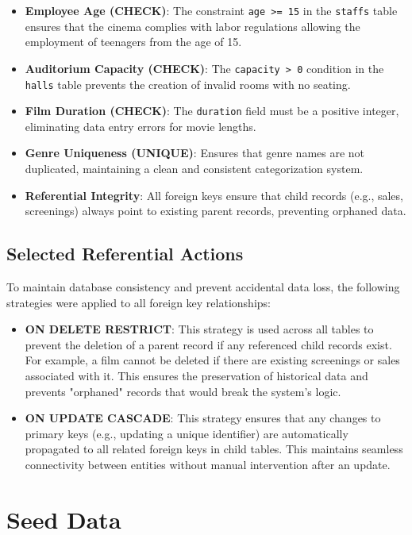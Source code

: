 \documentclass[11pt, a4paper]{article}
\begin{document}
\begin{itemize}
    \item \textbf{Employee Age (CHECK)}: The constraint \texttt{age >= 15} in the \texttt{staffs} table ensures that the cinema complies with labor regulations allowing the employment of teenagers from the age of 15.
    \item \textbf{Auditorium Capacity (CHECK)}: The \texttt{capacity > 0} condition in the \texttt{halls} table prevents the creation of invalid rooms with no seating.
    \item \textbf{Film Duration (CHECK)}: The \texttt{duration} field must be a positive integer, eliminating data entry errors for movie lengths.
    \item \textbf{Genre Uniqueness (UNIQUE)}: Ensures that genre names are not duplicated, maintaining a clean and consistent categorization system.
    \item \textbf{Referential Integrity}: All foreign keys ensure that child records (e.g., sales, screenings) always point to existing parent records, preventing orphaned data.
\end{itemize}

\subsection{Selected Referential Actions}
To maintain database consistency and prevent accidental data loss, the following strategies were applied to all foreign key relationships:

\begin{itemize}
    \item \textbf{ON DELETE RESTRICT}: This strategy is used across all tables to prevent the deletion of a parent record if any referenced child records exist. For example, a film cannot be deleted if there are existing screenings or sales associated with it. This ensures the preservation of historical data and prevents "orphaned" records that would break the system's logic.
    \item \textbf{ON UPDATE CASCADE}: This strategy ensures that any changes to primary keys (e.g., updating a unique identifier) are automatically propagated to all related foreign keys in child tables. This maintains seamless connectivity between entities without manual intervention after an update.
\end{itemize}
\newpage


\section{Seed Data}
\end{document}
